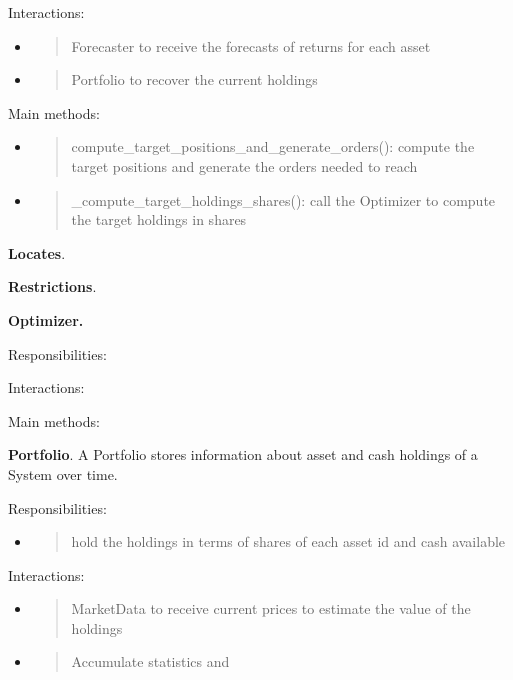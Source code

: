 \documentclass[11pt, reqno]{amsart}
\begin{document}
Interactions:

\begin{itemize}
\item
  \begin{quote}
  Forecaster to receive the forecasts of returns for each asset
  \end{quote}
\item
  \begin{quote}
  Portfolio to recover the current holdings
  \end{quote}
\end{itemize}

Main methods:

\begin{itemize}
\item
  \begin{quote}
  compute\_target\_positions\_and\_generate\_orders(): compute the
  target positions and generate the orders needed to reach
  \end{quote}
\item
  \begin{quote}
  \_compute\_target\_holdings\_shares(): call the Optimizer to compute
  the target holdings in shares
  \end{quote}
\end{itemize}

\textbf{Locates}.

\textbf{Restrictions}.

\textbf{Optimizer.}

Responsibilities:

Interactions:

Main methods:

\textbf{Portfolio}. A Portfolio stores information about asset and cash
holdings of a System over time.

Responsibilities:

\begin{itemize}
\item
  \begin{quote}
  hold the holdings in terms of shares of each asset id and cash
  available
  \end{quote}
\end{itemize}

Interactions:

\begin{itemize}
\item
  \begin{quote}
  MarketData to receive current prices to estimate the value of the
  holdings
  \end{quote}
\item
  \begin{quote}
  Accumulate statistics and
  \end{quote}
\end{itemize}
\end{document}
